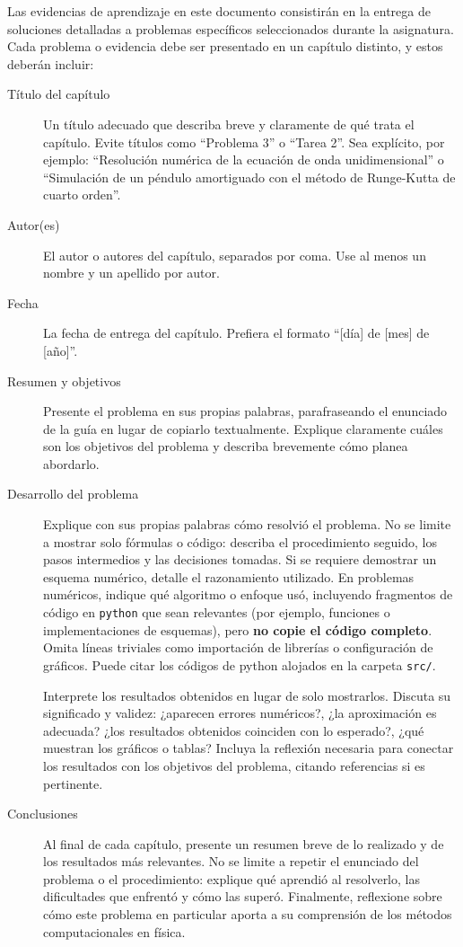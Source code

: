 \documentclass[../portafolio.tex]{subfiles}
\begin{document}
Las evidencias de aprendizaje en este documento consistirán en la
entrega de soluciones detalladas a problemas específicos seleccionados
durante la asignatura. Cada problema o evidencia debe ser presentado en un capítulo distinto, y estos deberán incluir:
%
\begin{description}
\item[Título del capítulo] Un título adecuado que describa breve y claramente de qué trata el capítulo. Evite títulos como ``Problema 3'' o ``Tarea 2''. Sea explícito, por ejemplo: ``Resolución numérica de la ecuación de onda unidimensional'' o ``Simulación de un péndulo amortiguado con el método de Runge-Kutta de cuarto orden''.
\item[Autor(es)] El autor o autores del capítulo, separados por coma. Use al menos un nombre y un apellido por autor.
\item[Fecha] La fecha de entrega del capítulo. Prefiera el formato ``[día] de [mes] de [año]''.

\item[Resumen y objetivos] Presente el problema en sus propias
  palabras, parafraseando el enunciado de la guía en lugar de copiarlo
  textualmente. Explique claramente cuáles son los objetivos del
  problema y describa brevemente cómo planea abordarlo.

\item[Desarrollo del problema] Explique con sus propias palabras cómo
  resolvió el problema. No se limite a mostrar solo fórmulas o código:
  describa el procedimiento seguido, los pasos intermedios y las
  decisiones tomadas.  Si se requiere demostrar un esquema numérico,
  detalle el razonamiento utilizado. En problemas numéricos, indique
  qué algoritmo o enfoque usó, incluyendo fragmentos de código en
  \lstinline!python! que sean relevantes (por ejemplo, funciones o
  implementaciones de esquemas), pero \textbf{no copie el código
    completo}. Omita líneas triviales como importación de librerías o
  configuración de gráficos. Puede citar los códigos de python alojados en la carpeta \lstinline!src/!.

  Interprete los resultados obtenidos en lugar de solo
  mostrarlos. Discuta su significado y validez: ¿aparecen errores
  numéricos?, ¿la aproximación es adecuada? ¿los resultados obtenidos coinciden con lo esperado?, ¿qué muestran los gráficos
  o tablas? Incluya la reflexión necesaria para conectar los
  resultados con los objetivos del problema, citando referencias si es
  pertinente.

\item[Conclusiones] Al final de cada capítulo, presente un resumen
  breve de lo realizado y de los resultados más relevantes. No se
  limite a repetir el enunciado del problema o el procedimiento:
  explique qué aprendió al resolverlo, las dificultades que enfrentó y
  cómo las superó. Finalmente, reflexione sobre cómo este problema en
  particular aporta a su comprensión de los métodos computacionales en
  física.


\end{description}
\end{document}
